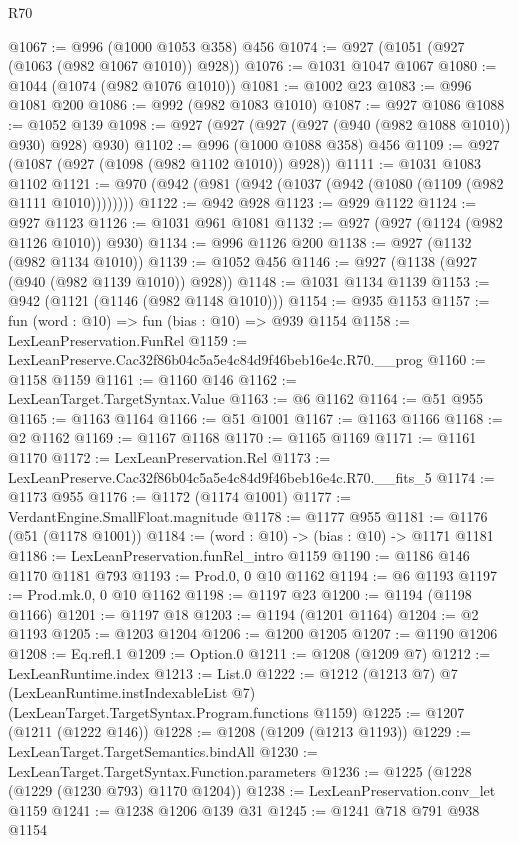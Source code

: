 \begin{lexlean}{R70}
\begin{coremodule}
@1067 := @996 (@1000 @1053 @358) @456
@1074 := @927 (@1051 (@927 (@1063 (@982 @1067 @1010)) @928))
@1076 := @1031 @1047 @1067
@1080 := @1044 (@1074 (@982 @1076 @1010))
@1081 := @1002 @23
@1083 := @996 @1081 @200
@1086 := @992 (@982 @1083 @1010)
@1087 := @927 @1086
@1088 := @1052 @139
@1098 := @927 (@927 (@927 (@927 (@940 (@982 @1088 @1010)) @930) @928) @930)
@1102 := @996 (@1000 @1088 @358) @456
@1109 := @927 (@1087 (@927 (@1098 (@982 @1102 @1010)) @928))
@1111 := @1031 @1083 @1102
@1121 := @970 (@942 (@981 (@942 (@1037 (@942 (@1080 (@1109 (@982 @1111 @1010))))))))
@1122 := @942 @928
@1123 := @929 @1122
@1124 := @927 @1123
@1126 := @1031 @961 @1081
@1132 := @927 (@927 (@1124 (@982 @1126 @1010)) @930)
@1134 := @996 @1126 @200
@1138 := @927 (@1132 (@982 @1134 @1010))
@1139 := @1052 @456
@1146 := @927 (@1138 (@927 (@940 (@982 @1139 @1010)) @928))
@1148 := @1031 @1134 @1139
@1153 := @942 (@1121 (@1146 (@982 @1148 @1010)))
@1154 := @935 @1153
@1157 := fun (word : @10) => fun (bias : @10) => @939 @1154
@1158 := LexLeanPreservation.FunRel
@1159 := LexLeanPreserve.Cac32f86b04c5a5e4c84d9f46beb16e4c.R70.__prog
@1160 := @1158 @1159
@1161 := @1160 @146
@1162 := LexLeanTarget.TargetSyntax.Value
@1163 := @6 @1162
@1164 := @51 @955
@1165 := @1163 @1164
@1166 := @51 @1001
@1167 := @1163 @1166
@1168 := @2 @1162
@1169 := @1167 @1168
@1170 := @1165 @1169
@1171 := @1161 @1170
@1172 := LexLeanPreservation.Rel
@1173 := LexLeanPreserve.Cac32f86b04c5a5e4c84d9f46beb16e4c.R70.__fits_5
@1174 := @1173 @955
@1176 := @1172 (@1174 @1001)
@1177 := VerdantEngine.SmallFloat.magnitude
@1178 := @1177 @955
@1181 := @1176 (@51 (@1178 @1001))
@1184 := (word : @10) -> (bias : @10) -> @1171 @1181
@1186 := LexLeanPreservation.funRel_intro @1159
@1190 := @1186 @146 @1170 @1181 @793
@1193 := Prod.{0, 0} @10 @1162
@1194 := @6 @1193
@1197 := Prod.mk.{0, 0} @10 @1162
@1198 := @1197 @23
@1200 := @1194 (@1198 @1166)
@1201 := @1197 @18
@1203 := @1194 (@1201 @1164)
@1204 := @2 @1193
@1205 := @1203 @1204
@1206 := @1200 @1205
@1207 := @1190 @1206
@1208 := Eq.refl.{1}
@1209 := Option.{0}
@1211 := @1208 (@1209 @7)
@1212 := LexLeanRuntime.index
@1213 := List.{0}
@1222 := @1212
    (@1213 @7)
    @7
    (LexLeanRuntime.instIndexableList @7)
    (LexLeanTarget.TargetSyntax.Program.functions @1159)
@1225 := @1207 (@1211 (@1222 @146))
@1228 := @1208 (@1209 (@1213 @1193))
@1229 := LexLeanTarget.TargetSemantics.bindAll
@1230 := LexLeanTarget.TargetSyntax.Function.parameters
@1236 := @1225 (@1228 (@1229 (@1230 @793) @1170 @1204))
@1238 := LexLeanPreservation.conv_let @1159
@1241 := @1238 @1206 @139 @31
@1245 := @1241 @718 @791 @938 @1154

\end{coremodule}
\end{lexlean}
